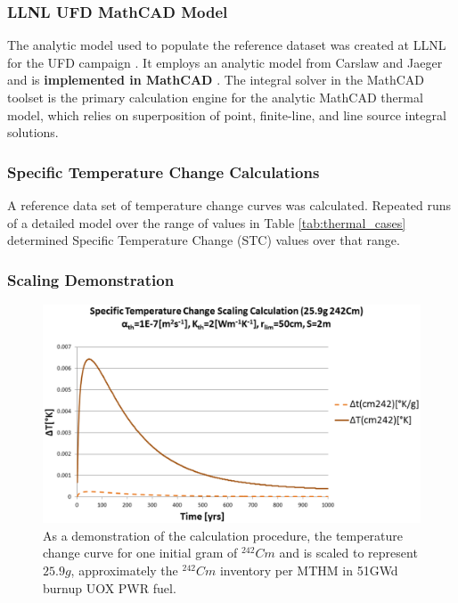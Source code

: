 

\begin{frame}[ctb!]
\frametitle{LLNL UFD MathCAD Model}
\footnotesize{
The analytic model used to populate the reference dataset was created at 
LLNL for the UFD campaign \cite{hardin_generic_2011, 
greenberg_investigations_2012, greenberg_application_2012}. It employs an 
analytic model from Carslaw and Jaeger and is \textbf{implemented in MathCAD}
\cite{carslaw_conduction_1959, ptc_mathcad_2010}.  The integral solver in the 
MathCAD toolset is the primary calculation engine for the analytic MathCAD 
thermal model, which relies on superposition of point, finite-line, and line 
source integral solutions.  
}
\end{frame}

\begin{frame}[ctb!]
\frametitle{Specific Temperature Change Calculations}
\footnotesize{A reference data set of temperature change curves was calculated. 
Repeated runs of a detailed model over the range of values in Table 
\ref{tab:thermal_cases} determined Specific Temperature Change (STC) values 
over that range.


}
\end{frame}

\begin{frame}[ctb!]
\frametitle{Scaling Demonstration}
\footnotesize{

\begin{figure}[h!]
\begin{center}
\includegraphics[width=\linewidth]{./images/CmScaling.eps}
\end{center}
\caption{As a demonstration of the calculation procedure, the temperature change 
  curve for one initial gram of $^{242}Cm$ and is scaled to represent $25.9g$, 
  approximately the $^{242}Cm$ inventory per MTHM in 51GWd burnup UOX PWR fuel. }
\label{fig:CmScaling}
\end{figure}
}
\end{frame}

